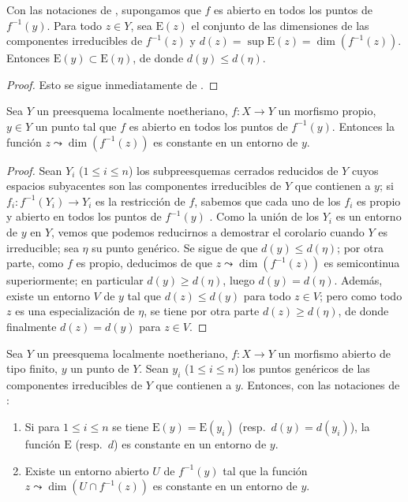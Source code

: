 \begin{corollary}[14.2.4]
\label{IV.14.2.4}
Con las notaciones de , supongamos que $f$ es abierto en todos los puntos de $f^{-1}(y)$.
Para todo $z\in Y$, sea $\mathrm{E}(z)$ el conjunto de las dimensiones de las componentes irreducibles de $f^{-1}(z)$ y $d(z)=\sup\mathrm{E}(z)=\dim(f^{-1}(z))$.
Entonces $\mathrm{E}(y)\subset\mathrm{E}(\eta)$, de donde $d(y)\leq d(\eta)$.
\end{corollary}

\begin{proof}
Esto se sigue inmediatamente de .
\end{proof}

\begin{corollary}[14.2.5]
\label{IV.14.2.5}
Sea $Y$ un preesquema localmente noetheriano, $f:X\to Y$ un morfismo propio, $y\in Y$ un punto tal que $f$ es abierto en todos los puntos de $f^{-1}(y)$.
Entonces la función $z\leadsto\dim(f^{-1}(z))$ es constante en un entorno de $y$.
\end{corollary}

\begin{proof}
Sean $Y_i$ ($1\leq i\leq n$) los subpreesquemas cerrados reducidos de $Y$ cuyos espacios subyacentes son las componentes irreducibles de $Y$ que contienen a $y$; si $f_i:f^{-1}(Y_i)\to Y_i$ es la restricción de $f$, sabemos que cada uno de los $f_i$ es propio  y abierto en todos los puntos de $f^{-1}(y)$ .
Como la unión de los $Y_i$ es un entorno de $y$ en $Y$,
vemos que podemos reducirnos a demostrar el corolario cuando $Y$ es irreducible; sea $\eta$ su punto genérico.
Se sigue de  que $d(y)\leq d(\eta)$; por otra parte, como $f$ es propio, deducimos de  que $z\leadsto\dim(f^{-1}(z))$ es semicontinua superiormente; en particular $d(y)\geq d(\eta)$, luego $d(y)=d(\eta)$.
Además, existe un entorno $V$ de $y$ tal que $d(z)\leq d(y)$ para todo $z\in V$; pero como todo $z$ es una especialización de $\eta$, se tiene por otra parte $d(z)\geq d(\eta)$, de donde finalmente $d(z)=d(y)$ para $z\in V$.
\end{proof}

\begin{corollary}[14.2.6]
\label{IV.14.2.6}
Sea $Y$ un preesquema localmente noetheriano, $f:X\to Y$ un morfismo abierto de tipo finito, $y$ un punto de $Y$.
Sean $y_i$ ($1\leq i\leq n$) los puntos genéricos de las componentes irreducibles de $Y$ que contienen a $y$.
Entonces, con las notaciones de :
\begin{enumerate}[label=(\roman*)]
  \item Si para $1\leq i\leq n$ se tiene $\mathrm{E}(y)=\mathrm{E}(y_i)$ \textup{(resp.\ $d(y)=d(y_i)$)}, la función $\mathrm{E}$ \textup{(resp.\ $d$)} es constante en un entorno de $y$.
  \item Existe un entorno abierto $U$ de $f^{-1}(y)$ tal que la función $z\leadsto\dim(U\cap f^{-1}(z))$ es constante en un entorno de $y$.
\end{enumerate}
\end{corollary}

